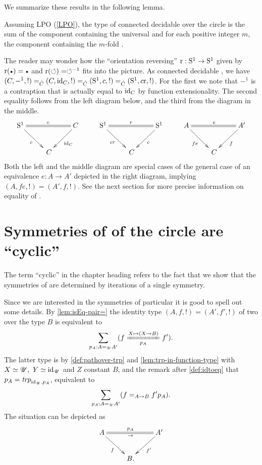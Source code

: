 We summarize these results in the following lemma.

\begin{lemma}
  \label{lem:componentsofcoversofS1}
Assuming LPO (\cref{LPO}), the type of connected decidable \coverings over the circle is the sum
of the component containing the universal \covering and for each positive integer $m$, 
the component containing the $m$-fold \covering.
\end{lemma}

\begin{remark}
  \label{rem:flipthecircle}
The reader may wonder how the ``orientation reversing'' $\mathrm{r}:{\mathrm{S}^1}\to {\mathrm{S}^1}$ given
by $\revers(\base)=\base$ and $\mathrm{r}(\circlearrowleft)=\circlearrowleft^{-1}$ fits into the picture.
As connected decidable \coverings, we have
$(C,-^1,!) =_{\hat C} (C,\mathord{\mathrm{id}}_C,!) =_{\hat C} ({\mathrm{S}^1},c,!) =_{\hat C} ({\mathrm{S}^1},c\mathrm{r},!)$.
For the first we note that $-^1$ is a contraption that is actually equal to 
$\mathord{\mathrm{id}}_C$ by function extensionality. The second equality follows from the left
diagram below, and the third from the diagram in the middle.
\[
\xymatrix{
\Sc\ar@{=}[rr]^{\etop{c}}\ar[dr]_{c}&&C\ar[dl]^{\id_C} &
\Sc\ar@{=}[rr]^{\etop{r}}\ar[dr]_{cr}&&\Sc\ar[dl]^{c} &
A\ar@{=}[rr]^{\etop{e}}\ar[dr]_{fe}&&A'\ar[dl]^{f}
\\
&\,C&&&\,C&&&\,C&}
\]
Both the left and the middle diagram are special cases of the general case of an equivalence
$e: A\to A'$ depicted in the right diagram, implying $(A,fe,!)=(A',f,!)$.
See the next section for more precise information on equality of \coverings.
\end{remark}


\section{Symmetries of \coverings of the circle are ``cyclic'' }
\label{sec:deckS1}

The term ``cyclic'' in the chapter heading refers to the fact that we show 
that the symmetries of \coverings are determined by iterations of a single symmetry.  

\begin{remark}
Since we are interested in the symmetries of particular \coverings it is 
good to spell out some details.
By \cref{lem:isEq-pair=} the identity type $(A,f,!)=(A',f',!)$ of 
two \coverings over the type $B$ is equivalent to
\[
\sum_{p_A:A=_{\UU}A'}(\pathover{f}{X\mapsto(X\to B)}{p_A}{f'}).
\]
The latter type is by \cref{def:pathover-trp} and \cref{lem:trp-in-function-type}
with $X\jdeq\UU,~Y\jdeq\id_{\UU}$ and $Z$ constant $B$, and the remark
after \cref{def:idtoeq} that $\ptoe{p}_A = \trp[\id_{\UU}]{p_A}$, equivalent to
\[
\sum_{p_A:A=_{{\mathscr{U}}}A'}(f =_{A\to B}f'{p}_A). 
\]
The situation can be depicted as
$$\xymatrix{A\ar@{=}[rr]^{p_A}_\to\ar[dr]_f&&A'\ar[dl]^{f'}\\&\,B.&}$$
\end{remark}

